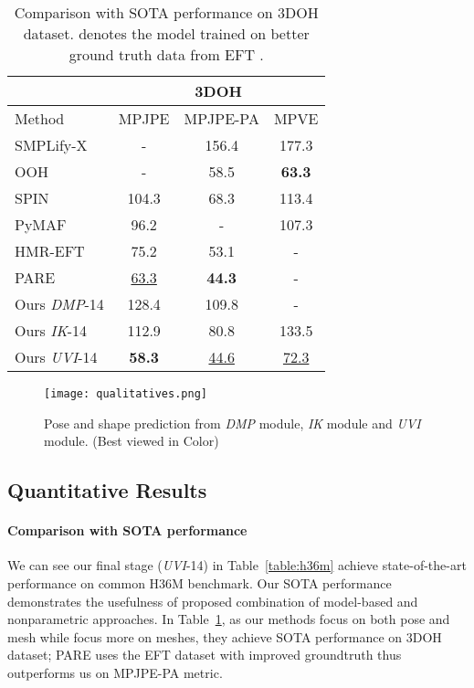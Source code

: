 \documentclass[10pt,twocolumn,letterpaper]{article}
\begin{document}
\begin{table}
\begin{center}
\small
\begin{tabular}{l|c|c |c}
\hline
      &  \multicolumn{3}{c}{3DOH}  \\
\hline
Method  & MPJPE & MPJPE-PA & MPVE\\
\hline
SMPLify-X  &  -  & 156.4   &  177.3\\
OOH \cite{cvprooh}  &  -  & 58.5   &  \textbf{63.3}\\
SPIN \cite{spin}   &   104.3 & 68.3 & 113.4\\
PyMAF\cite{pymaf}   &   96.2 & - & 107.3\\
HMR-EFT \cite{EFT} &   75.2 & 53.1 & -\\
PARE \cite{pare}  &  \underline{63.3} & \textbf{44.3}  & -\\
\hline
Ours \textit{DMP}-14    & 128.4 & 109.8  & - \\
Ours \textit{IK}-14    & 112.9  & 80.8 & 133.5\\
Ours \textit{UVI}-14    &  \textbf{58.3} &  \underline{44.6} &  \underline{72.3}   \\
\hline
\end{tabular}
\end{center}
\caption{Comparison with SOTA performance on 3DOH dataset.  denotes the model trained on better ground truth data from EFT \cite{EFT}. }
\label{table:3doh}
\end{table}



\begin{figure*}[t]
\begin{center}
   \texttt{[image: qualitatives.png]}
\end{center}
   \caption{Pose and shape prediction from \textit{DMP} module, \textit{IK} module and \textit{UVI} module. (Best viewed in Color) }
\label{fig:qualitative}
\end{figure*}








\subsection{Quantitative Results}

\paragraph{Comparison with SOTA performance} We can see our final stage (\textit{UVI}-14) in Table~\ref{table:h36m} achieve state-of-the-art performance on common H36M benchmark. Our SOTA performance demonstrates the usefulness of proposed combination of model-based and nonparametric approaches. In Table~\ref{table:3doh}, as our methods focus on both pose and mesh while \cite{cvprooh} focus more on meshes, they achieve SOTA performance on 3DOH dataset; PARE \cite{pare} uses the  EFT dataset \cite{EFT} with improved groundtruth  thus outperforms us on MPJPE-PA metric.  
\end{document}
